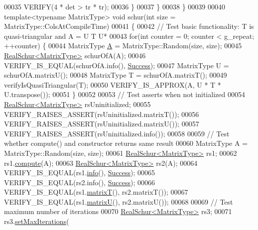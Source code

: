 \begin{DoxyCode}
00035       VERIFY(4 * det > tr * tr);
00036     \}
00037   \}
00038 \}
00039 
00040 \textcolor{keyword}{template}<\textcolor{keyword}{typename} MatrixType> \textcolor{keywordtype}{void} schur(\textcolor{keywordtype}{int} size = MatrixType::ColsAtCompileTime)
00041 \{
00042   \textcolor{comment}{// Test basic functionality: T is quasi-triangular and A = U T U*}
00043   \textcolor{keywordflow}{for}(\textcolor{keywordtype}{int} counter = 0; counter < g\_repeat; ++counter) \{
00044     MatrixType \hyperlink{group___core___module_class_eigen_1_1_matrix}{A} = MatrixType::Random(size, size);
00045     \hyperlink{group___eigenvalues___module}{RealSchur<MatrixType>} schurOfA(A);
00046     VERIFY\_IS\_EQUAL(schurOfA.info(), \hyperlink{group__enums_gga85fad7b87587764e5cf6b513a9e0ee5ea52581b035f4b59c203b8ff999ef5fcea}{Success});
00047     MatrixType U = schurOfA.matrixU();
00048     MatrixType T = schurOfA.matrixT();
00049     verifyIsQuasiTriangular(T);
00050     VERIFY\_IS\_APPROX(A, U * T * U.transpose());
00051   \}
00052 
00053   \textcolor{comment}{// Test asserts when not initialized}
00054   \hyperlink{group___eigenvalues___module}{RealSchur<MatrixType>} rsUninitialized;
00055   VERIFY\_RAISES\_ASSERT(rsUninitialized.matrixT());
00056   VERIFY\_RAISES\_ASSERT(rsUninitialized.matrixU());
00057   VERIFY\_RAISES\_ASSERT(rsUninitialized.info());
00058   
00059   \textcolor{comment}{// Test whether compute() and constructor returns same result}
00060   MatrixType A = MatrixType::Random(size, size);
00061   \hyperlink{group___eigenvalues___module}{RealSchur<MatrixType>} rs1;
00062   rs1.\hyperlink{group___eigenvalues___module_a60caf9ffad11d728ea458c4dd36d0a98}{compute}(A);
00063   \hyperlink{group___eigenvalues___module}{RealSchur<MatrixType>} rs2(A);
00064   VERIFY\_IS\_EQUAL(rs1.\hyperlink{group___eigenvalues___module_a386fd2b1a3a8401eca7183ac074deec8}{info}(), \hyperlink{group__enums_gga85fad7b87587764e5cf6b513a9e0ee5ea52581b035f4b59c203b8ff999ef5fcea}{Success});
00065   VERIFY\_IS\_EQUAL(rs2.info(), \hyperlink{group__enums_gga85fad7b87587764e5cf6b513a9e0ee5ea52581b035f4b59c203b8ff999ef5fcea}{Success});
00066   VERIFY\_IS\_EQUAL(rs1.\hyperlink{group___eigenvalues___module_abb78996b43b8642a5f507415730445cb}{matrixT}(), rs2.matrixT());
00067   VERIFY\_IS\_EQUAL(rs1.\hyperlink{group___eigenvalues___module_a85622ccbecff99c8933d21f0a22b22bb}{matrixU}(), rs2.matrixU());
00068 
00069   \textcolor{comment}{// Test maximum number of iterations}
00070   \hyperlink{group___eigenvalues___module}{RealSchur<MatrixType>} rs3;
00071   rs3.\hyperlink{group___eigenvalues___module_ad189e8776ee20a12046694f98b354322}{setMaxIterations}(

\end{DoxyCode}
